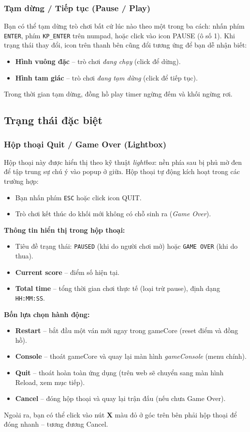 \documentclass[12pt,a4paper]{article}
\begin{document}
\subsubsection{Tạm dừng / Tiếp tục (Pause / Play)}
Bạn có thể tạm dừng trò chơi bất cứ lúc nào theo một trong ba cách: nhấn phím \texttt{ENTER}, phím \texttt{KP\_ENTER} trên numpad, hoặc click vào icon PAUSE (ô số 1).
Khi trạng thái thay đổi, icon trên thanh bên cũng đổi tương ứng để bạn dễ nhận biết:
\begin{itemize}
    \item \textbf{Hình vuông đặc} -- trò chơi \textit{đang chạy} (click để dừng).
    \item \textbf{Hình tam giác} -- trò chơi \textit{đang tạm dừng} (click để tiếp tục).
\end{itemize}
Trong thời gian tạm dừng, đồng hồ play timer ngừng đếm và khối ngừng rơi.
\subsection{Trạng thái đặc biệt}

\subsubsection{Hộp thoại Quit / Game Over (Lightbox)}
Hộp thoại này được hiển thị theo kỹ thuật \textit{lightbox}: nền phía sau bị phủ mờ đen để tập trung sự chú ý vào popup ở giữa.
Hộp thoại tự động kích hoạt trong các trường hợp:
\begin{itemize}
    \item Bạn nhấn phím \texttt{ESC} hoặc click icon QUIT.
    \item Trò chơi kết thúc do khối mới không có chỗ sinh ra (\textit{Game Over}).
\end{itemize}

\noindent\textbf{Thông tin hiển thị trong hộp thoại:}
\begin{itemize}
    \item Tiêu đề trạng thái: \texttt{PAUSED} (khi do người chơi mở) hoặc \texttt{GAME OVER} (khi do thua).
    \item \textbf{Current score} -- điểm số hiện tại.
    \item \textbf{Total time} -- tổng thời gian chơi thực tế (loại trừ pause), định dạng \texttt{HH:MM:SS}.
\end{itemize}

\noindent\textbf{Bốn lựa chọn hành động:}
\begin{itemize}
    \item \textbf{Restart} -- bắt đầu một ván mới ngay trong gameCore (reset điểm và đồng hồ).
    \item \textbf{Console} -- thoát gameCore và quay lại màn hình \textit{gameConsole} (menu chính).
    \item \textbf{Quit} -- thoát hoàn toàn ứng dụng (trên web sẽ chuyển sang màn hình Reload, xem mục tiếp).
    \item \textbf{Cancel} -- đóng hộp thoại và quay lại trận đấu (nếu chưa Game Over).
\end{itemize}
Ngoài ra, bạn có thể click vào nút \textbf{X} màu đỏ ở góc trên bên phải hộp thoại để đóng nhanh -- tương đương Cancel.
\end{document}
